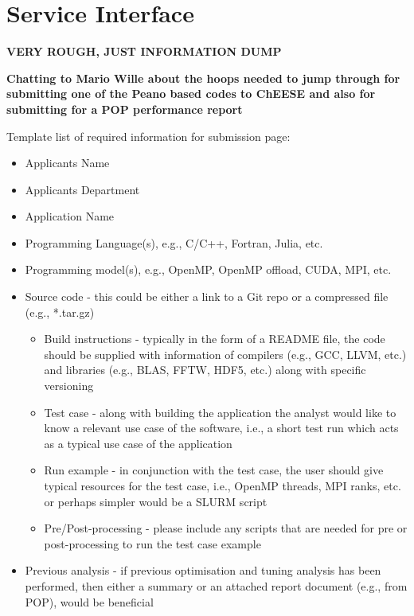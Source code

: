 \chapter{Service Interface}
\label{chapter:service-interface}
\textbf{VERY ROUGH, JUST INFORMATION DUMP}

\noindent \textbf{Chatting to Mario Wille about the hoops needed to jump through for submitting one of the Peano based codes to ChEESE and also for submitting for a POP performance report}


Template list of required information for submission page:
\begin{itemize}
  \item Applicants Name
  \item Applicants Department
  \item Application Name
  \item Programming Language(s), e.g., C/C++, Fortran, Julia, etc.
  \item Programming model(s), e.g., OpenMP, OpenMP offload, CUDA, MPI, etc.
  \item Source code - this could be either a link to a Git repo or a compressed file (e.g., *.tar.gz)
  \begin{itemize}
    \item Build instructions - typically in the form of a README file, the code should be supplied with information of compilers (e.g., GCC, LLVM, etc.) and libraries (e.g., BLAS, FFTW, HDF5, etc.) along with specific versioning
    \item Test case - along with building the application the analyst would like to know a relevant use case of the software, i.e., a short test run which acts as a typical use case of the application
    \item Run example - in conjunction with the test case, the user should give typical resources for the test case, i.e., OpenMP threads, MPI ranks, etc. or perhaps simpler would be a SLURM script
    \item Pre/Post-processing - please include any scripts that are needed for pre or post-processing to run the test case example
  \end{itemize}
  \item Previous analysis - if previous optimisation and tuning analysis has been performed, then either a summary or an attached report document (e.g., from POP), would be beneficial
\end{itemize}

